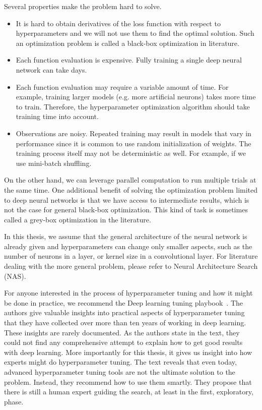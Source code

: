 Several properties make the problem hard to solve.
\begin{itemize}
    \item It is hard to obtain derivatives of the loss function with respect to hyperparameters and we will not use them to find the optimal solution. Such an optimization problem is called a black-box optimization in literature.
    \item Each function evaluation is expensive. Fully training a single deep neural network can take days.
    \item Each function evaluation may require a variable amount of time. For example, training larger models (e.g. more artificial neurons) takes more time to train. Therefore, the hyperparameter optimization algorithm should take training time into account.
    \item Observations are noisy. Repeated training may result in models that vary in performance since it is common to use random initialization of weights. The training process itself may not be deterministic as well. For example, if we use mini-batch shuffling.
\end{itemize}

On the other hand, we can leverage parallel computation to run multiple trials at the same time. One additional benefit of solving the optimization problem limited to deep neural networks is that we have access to intermediate results, which is not the case for general black-box optimization. This kind of task is sometimes called a grey-box optimization in the literature.


In this thesis, we assume that the general architecture of the neural network is already given and hyperparameters can change only smaller aspects, such as the number of neurons in a layer, or kernel size in a convolutional layer. For literature dealing with the more general problem, please refer to Neural Architecture Search (NAS).

For anyone interested in the process of hyperparameter tuning and how it might be done in practice, we recommend the Deep learning tuning playbook~\cite{tuningplaybookgithub}. The authors give valuable insights into practical aspects of hyperparameter tuning that they have collected over more than ten years of working in deep learning. These insights are rarely documented. As the authors state in the text, they could not find any comprehensive attempt to explain how to get good results with deep learning. More importantly for this thesis, it gives us insight into how experts might do hyperparameter tuning. The text reveals that even today, advanced hyperparameter tuning tools are not the ultimate solution to the problem. Instead, they recommend how to use them smartly. They propose that there is still a human expert guiding the search, at least in the first, exploratory, phase.



